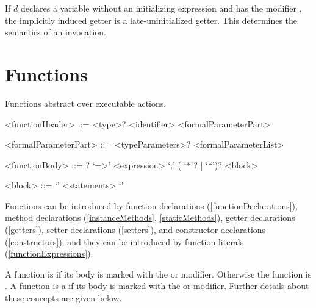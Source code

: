 \documentclass[makeidx]{article}
\begin{document}
\begin{itemize}

  If $d$ declares a variable \id{} without an initializing expression
  and has the modifier \LATE,
  the implicitly induced getter is a late-uninitialized getter.
  This determines the semantics of an invocation.
\end{itemize}

\vspace{-\baselineskip}\EndCase

\vspace{-\baselineskip}\EndCase


\section{Functions}

\LMHash{}%
Functions abstract over executable actions.

\begin{grammar}
<functionHeader> ::= \gnewline{}
  <type>? <identifier> <formalParameterPart>

<formalParameterPart> ::= <typeParameters>? <formalParameterList>

<functionBody> ::= \ASYNC? `=>' <expression> `;'
  \alt (\ASYNC{} `*'? | \SYNC{} `*')? <block>

<block> ::= `{' <statements> `}'
\end{grammar}

\LMHash{}%
Functions can be introduced by function declarations
(\ref{functionDeclarations}),
method declarations (\ref{instanceMethods}, \ref{staticMethods}),
getter declarations (\ref{getters}),
setter declarations (\ref{setters}),
and constructor declarations (\ref{constructors});
and they can be introduced by function literals (\ref{functionExpressions}).

\LMHash{}%
A function is 
if its body is marked with the \ASYNC{} or \code{\ASYNC*} modifier.
Otherwise the function is .
A function is a 
if its body is marked with the \code{\SYNC*} or \code{\ASYNC*} modifier.
Further details about these concepts are given below.
\end{document}
